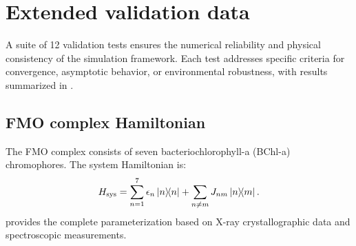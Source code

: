 \documentclass[11pt,a4paper]{article}
\begin{document}
\section{Extended validation data}\label{si:validation}

A suite of 12 validation tests ensures the numerical reliability and physical consistency of the simulation framework. Each test addresses specific criteria for convergence, asymptotic behavior, or environmental robustness, with results summarized in .

\subsection{FMO complex Hamiltonian}

The FMO complex consists of seven bacteriochlorophyll-a (BChl-a) chromophores. The system Hamiltonian is:
\begin{equation}
H_{\mathrm{sys}} = \sum_{n=1}^{7} \epsilon_n \dyad{n} + \sum_{n \neq m} J_{nm} \dyad{n}{m}.
\end{equation}
 provides the complete parameterization based on X-ray crystallographic data and spectroscopic measurements.
\end{document}
